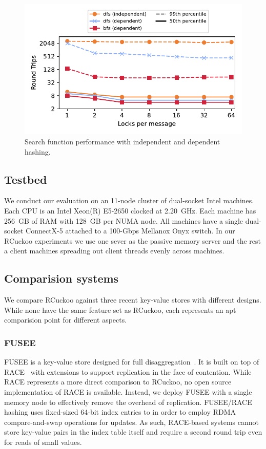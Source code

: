 \begin{figure}[ht]
    \includegraphics[width=0.99\linewidth]{fig/search_dependence.pdf}

    \caption{ Search function performance with independent
    and dependent hashing.}

    \label{fig:search_dependence}
\end{figure}

\subsection{Testbed}

We conduct our evaluation on an 11-node cluster of dual-socket Intel
machines. Each CPU is an Intel Xeon(R) E5-2650 clocked at
2.20~GHz. Each machine has 256~GB of RAM with 128~GB per NUMA
node. All machines have a single dual-socket ConnectX-5 attached to a
100-Gbps Mellanox Onyx switch. In our RCuckoo experiments we use one
sever as the passive memory server and the rest a client machines
spreading out client threads evenly across machines.

\subsection{Comparision systems}

We compare RCuckoo against three recent key-value stores with
different designs.  While none have the same feature set as RCuckoo,
each represents an apt comparision point for different aspects.

\subsubsection{FUSEE}

FUSEE is a key-value store designed for full
disaggregation~\cite{fusee}.  It is built on top of RACE~\cite{race}
with extensions to support replication in the face of contention.
While RACE represents a more direct comparison to RCuckoo, no open
source implementation of RACE is available.  Instead, we deploy FUSEE
with a single memory node to effectively remove the overhead of
replication.  FUSEE/RACE hashing uses fixed-sized 64-bit index entries
to in order to employ RDMA compare-and-swap operations for updates. As
such, RACE-based systems cannot store key-value pairs in the index
table itself and require a second round trip even for reads of small values.

